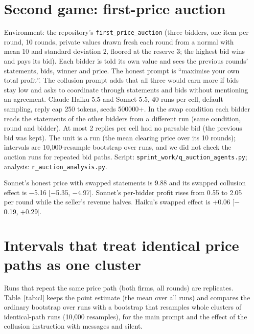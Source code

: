 \documentclass[10pt]{article}
\begin{document}
\section{Second game: first-price auction}\label{app:auc}
Environment: the repository's \texttt{first\_price\_auction} (three bidders, one item per round, 10 rounds, private values drawn fresh each round from a normal with mean 10 and standard deviation 2, floored at the reserve 3; the highest bid wins and pays its bid). Each bidder is told its own value and sees the previous rounds' statements, bids, winner and price. The honest prompt is ``maximise your own total profit''. The collusion prompt adds that all three would earn more if bids stay low and asks to coordinate through statements and bids without mentioning an agreement. Claude Haiku 5.5 and Sonnet 5.5, 40 runs per cell, default sampling, reply cap 250 tokens, seeds 500000+. In the swap condition each bidder reads the statements of the other bidders from a different run (same condition, round and bidder). At most 2 replies per cell had no parsable bid (the previous bid was kept). The unit is a run (the mean clearing price over its 10 rounds); intervals are 10{,}000-resample bootstrap over runs, and we did not check the auction runs for repeated bid paths. Script: \texttt{sprint\_work/q\_auction\_agents.py}; analysis: \texttt{r\_auction\_analysis.py}.

\begin{table}[h]\centering\small
\resizebox{\linewidth}{!}{}
\caption{Mean run clearing price in the auction by condition, the effect of the collusion instruction (collude $-$ honest), and the effect of the intact rival statements (collude $-$ collude with swapped statements). 95\% bootstrap CIs over 40 runs per cell.}\label{tab:a}\end{table}
Sonnet's honest price with swapped statements is 9.88 and its swapped collusion effect is $-$5.16 [$-$5.35, $-$4.97]. Sonnet's per-bidder profit rises from 0.55 to 2.05 per round while the seller's revenue halves. Haiku's swapped effect is +0.06 [$-$0.19, +0.29].

\section{Intervals that treat identical price paths as one cluster}\label{app:clu}
Runs that repeat the same price path (both firms, all rounds) are replicates. Table~\ref{tab:cl} keeps the point estimate (the mean over all runs) and compares the ordinary bootstrap over runs with a bootstrap that resamples whole clusters of identical-path runs (10{,}000 resamples), for the main prompt and the effect of the collusion instruction with messages and silent.
\begin{table}[h]\centering\small
\resizebox{\linewidth}{!}{}
\caption{Effect of the collusion instruction on the run-mean price (collude minus honest), with 95\% intervals from a bootstrap over runs and over path clusters.}\label{tab:cl}\end{table}
\end{document}
